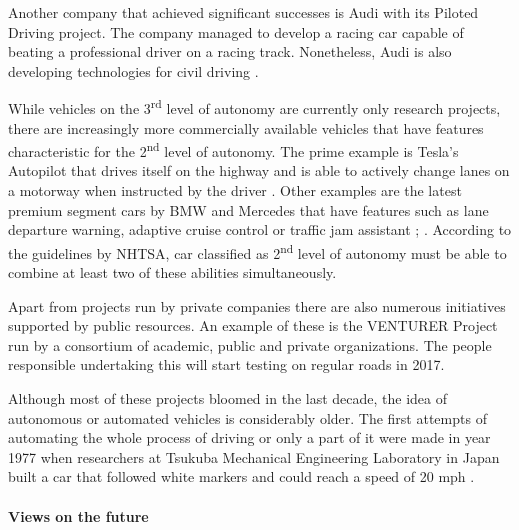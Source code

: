 \documentclass[11pt,english]{article}
\begin{document}
\par
Another company that achieved significant successes is Audi with its Piloted Driving project. The company managed to develop a racing car capable of beating a professional driver on a racing track. Nonetheless, Audi is also developing technologies for civil driving \citep{audi1}.

\par


While vehicles on the 3\textsuperscript{rd} level of autonomy are currently only research projects, there are increasingly more commercially available vehicles that have features characteristic for the 2\textsuperscript{nd} level of autonomy. The prime example is Tesla's Autopilot that drives itself on the highway and is able to actively change lanes on a motorway when instructed by the driver \citep{tesla2}. Other examples are the latest premium segment cars by BMW and Mercedes that have features such as lane departure warning, adaptive cruise control or traffic jam assistant \citep{bmw}; \citep{mercedes1}. According to the guidelines by NHTSA, car classified as 2\textsuperscript{nd} level of autonomy must be able to combine at least two of these abilities simultaneously.


\par

Apart from projects run by private companies there are also numerous initiatives supported by public resources. An example of these is the VENTURER Project run by a consortium of academic, public and private  organizations. The people responsible undertaking this will start testing on regular roads in 2017.

\par
Although most of these projects bloomed in the last decade, the idea of autonomous or automated vehicles is considerably older. The first attempts of automating the whole process of driving or only a part of it were made in year 1977 when researchers at Tsukuba Mechanical Engineering Laboratory in Japan built a car that followed white markers and could reach a speed of 20 mph \citep{forrest2007autonomous}.





\paragraph{Views on the future}
\end{document}
